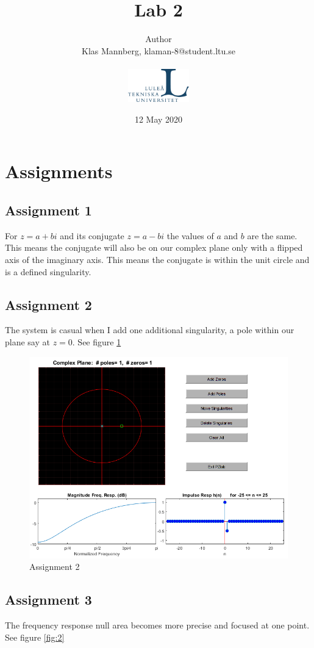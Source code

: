\documentclass[a4paper]{article}
\title{Lab 2}
\author{
Author \\
{Klas Mannberg,   klaman-8@student.ltu.se
} \\ \\
\includegraphics[width=0.2\textwidth]{ltu_swe.jpg}}
\date{12 May 2020}
\begin{document}
\maketitle

\section{Assignments}
\subsection{Assignment 1}
For $z=a+bi$  and its conjugate $z=a-bi$ the values of $a$ and $b$ are the same. This means the conjugate will also be on our complex plane only with a flipped axis of the imaginary axis. This means the conjugate is within the unit circle and is a defined singularity. 


\subsection{Assignment 2}
The system is casual when I add one additional singularity, a pole within our plane say at $z=0$. See figure \ref{fig:1}

\begin{figure}
    \centering
    \includegraphics{1.png}
    \caption{Assignment 2}
    \label{fig:1}
\end{figure}
\subsection{Assignment 3}
The frequency response null area becomes more precise and focused at one point. See figure \ref{fig:2}
\end{document}
